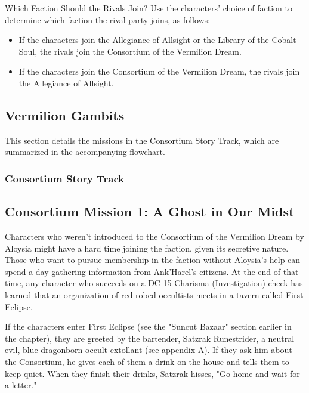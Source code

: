 \documentclass[10pt,a4paper,twoside,bg=print,twocolumn,openany,nodeprecatedcode]{dndbook}
\begin{document}
\begin{DndSidebar}[float=!b]{Which Faction Should the Rivals Join?}
Use the characters' choice of faction to determine which faction the rival party joins, as follows:




\begin{itemize}
\item If the characters join the Allegiance of Allsight or the Library of the Cobalt Soul, the rivals join the Consortium of the Vermilion Dream.
\item If the characters join the Consortium of the Vermilion Dream, the rivals join the Allegiance of Allsight.
\end{itemize}



\end{DndSidebar}

\subsection{Vermilion Gambits}
This section details the missions in the Consortium Story Track, which are summarized in the accompanying flowchart.

\subsubsection{Consortium Story Track}
\subsection{Consortium Mission 1: A Ghost in Our Midst}
Characters who weren't introduced to the Consortium of the Vermilion Dream by Aloysia might have a hard time joining the faction, given its secretive nature. Those who want to pursue membership in the faction without Aloysia's help can spend a day gathering information from Ank'Harel's citizens. At the end of that time, any character who succeeds on a DC 15 Charisma (Investigation) check has learned that an organization of red-robed occultists meets in a tavern called First Eclipse.

If the characters enter First Eclipse (see the "Suncut Bazaar" section earlier in the chapter), they are greeted by the bartender, Satzrak Runestrider, a neutral evil, blue dragonborn occult extollant (see appendix A). If they ask him about the Consortium, he gives each of them a drink on the house and tells them to keep quiet. When they finish their drinks, Satzrak hisses, "Go home and wait for a letter."
\end{document}
